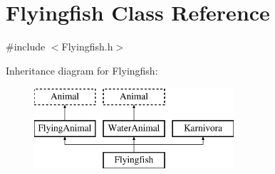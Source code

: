 \hypertarget{classFlyingfish}{\section{Flyingfish Class Reference}
\label{classFlyingfish}
}


{\ttfamily \#include $<$Flyingfish.\-h$>$}

Inheritance diagram for Flyingfish\-:\begin{figure}[H]
\begin{center}
\leavevmode
\includegraphics[height=3.000000cm]{classFlyingfish}
\end{center}
\end{figure}
